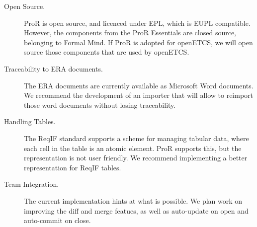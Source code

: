 \documentclass{template/openetcs_report}
\begin{document}
\begin{description}

\item[Open Source.] ProR is open source, and licenced under EPL, which is EUPL compatible.  However, the components from the ProR Essentials are closed source, belonging to Formal Mind.  If ProR is adopted for openETCS, we will open source those components that are used by openETCS.

\item[Traceability to ERA documents.]  The ERA documents are currently available as Microsoft Word documents.  We recommend the development of an importer that will allow to reimport those word documents without losing traceability.

\item[Handling Tables.]  The ReqIF standard supports a scheme for managing tabular data, where each cell in the table is an atomic element.  ProR supports this, but the representation is not user friendly.  We recommend implementing a better representation for ReqIF tables.

\item[Team Integration.]  The current implementation hints at what is possible.  We plan work on improving the diff and merge featues, as well as auto-update on open and auto-commit on close.

\end{description}





\appendix




\end{document}
